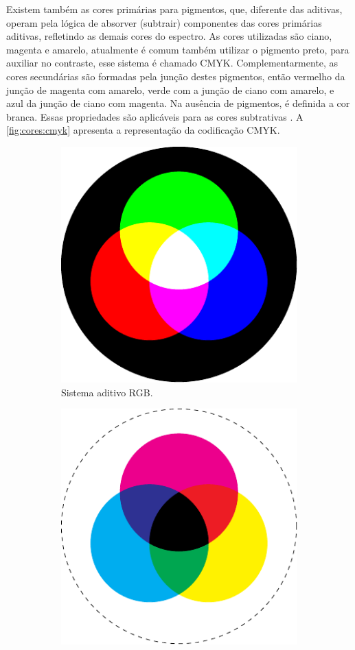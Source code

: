 Existem também as cores primárias para pigmentos, que, diferente das aditivas, operam pela lógica de absorver (subtrair) componentes das cores primárias aditivas, refletindo as demais cores do espectro.
As cores utilizadas são ciano, magenta e amarelo, atualmente é comum também utilizar o pigmento preto, para auxiliar no contraste, esse sistema é chamado \ac{CMYK}.
Complementarmente, as cores secundárias são formadas pela junção destes pigmentos, então vermelho da junção de magenta com amarelo, verde com a junção de ciano com amarelo, e azul da junção de ciano com magenta.
Na ausência de pigmentos, é definida a cor branca.
Essas propriedades são aplicáveis para as cores subtrativas \cite{gonzalez2008digital}.
A \autoref{fig:cores:cmyk} apresenta a representação da codificação \ac{CMYK}.

\begin{figure}[htbp]
    \centering
    \caption{Sistemas de codificação de cores aditivo () e subtrativo ().}
    \label{fig:cores}
    \hfill
    \begin{subfigure}[c]{0.45\textwidth}
        \centering
        \includegraphics{../pictures/RGB.pdf}
        \caption{Sistema aditivo \ac{RGB}.}
        \label{fig:cores:rgb}
    \end{subfigure}
    \hfill
    \begin{subfigure}[c]{0.45\textwidth}
        \centering
        \includegraphics{../pictures/CMYK.pdf}

\end{subfigure}
\end{figure}
